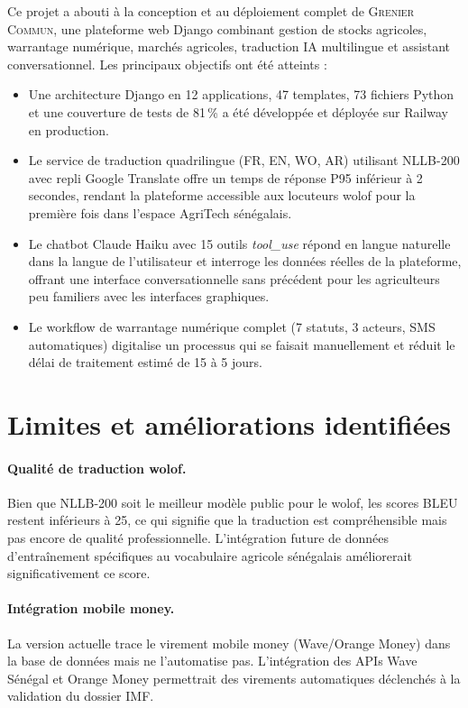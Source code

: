 \documentclass[12pt,a4paper,twoside]{report}
\newcommand{\gc}{\textsc{Grenier Commun}}
\begin{document}
Ce projet a abouti à la conception et au déploiement complet de \gc{},
une plateforme web Django combinant gestion de stocks agricoles, warrantage
numérique, marchés agricoles, traduction IA multilingue et assistant
conversationnel. Les principaux objectifs ont été atteints :

\begin{itemize}
  \item Une architecture Django en 12 applications, 47 templates, 73 fichiers
        Python et une couverture de tests de 81\,\% a été développée et déployée
        sur Railway en production.
  \item Le service de traduction quadrilingue (FR, EN, WO, AR) utilisant
        NLLB-200 avec repli Google Translate offre un temps de réponse P95
        inférieur à 2 secondes, rendant la plateforme accessible aux locuteurs
        wolof pour la première fois dans l'espace AgriTech sénégalais.
  \item Le chatbot Claude Haiku avec 15 outils \emph{tool\_use} répond en langue
        naturelle dans la langue de l'utilisateur et interroge les données réelles
        de la plateforme, offrant une interface conversationnelle sans précédent
        pour les agriculteurs peu familiers avec les interfaces graphiques.
  \item Le workflow de warrantage numérique complet (7 statuts, 3 acteurs,
        SMS automatiques) digitalise un processus qui se faisait manuellement
        et réduit le délai de traitement estimé de 15 à 5 jours.
\end{itemize}

\section*{Limites et améliorations identifiées}

\paragraph{Qualité de traduction wolof.}
Bien que NLLB-200 soit le meilleur modèle public pour le wolof, les scores
BLEU restent inférieurs à 25, ce qui signifie que la traduction est
compréhensible mais pas encore de qualité professionnelle. L'intégration
future de données d'entraînement spécifiques au vocabulaire agricole
sénégalais améliorerait significativement ce score.

\paragraph{Intégration mobile money.}
La version actuelle trace le virement mobile money (Wave/Orange Money) dans
la base de données mais ne l'automatise pas. L'intégration des APIs Wave
Sénégal et Orange Money permettrait des virements automatiques déclenchés
à la validation du dossier IMF.
\end{document}
